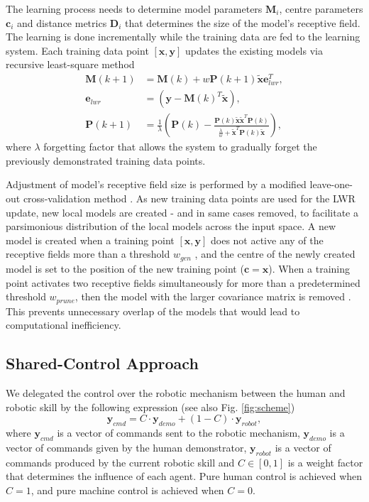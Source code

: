 The learning process needs to determine model parameters $\bm{M}_{i}$, centre parameters $\bm{c}_{i}$ and distance metrics $\bm{D}_{i}$ that determines the size of the model's receptive field. The learning is done incrementally while the training data are fed to the learning system. Each training data point $[\bm{x},\bm{y}]$ updates the existing models via  recursive least-square method \cite{Schaal1998}
\begin{align}
\bm{M}(k+1) &= \bm{M}(k) + w \bm{P}(k+1) \tilde{\bm{x}} \bm{e}_{lwr}^{T},\label{eq:lwr5} \\
\bm{e}_{lwr} &= (\bm{y}-\bm{M}(k)^{T}\tilde{\bm{x}}),\label{eq:lwr6} \\
\bm{P}(k+1) &= \frac{1}{\lambda}\left(\bm{P}(k)-\frac{\bm{P}(k)\tilde{\bm{x}}\tilde{\bm{x}}^{T}\bm{P}(k)}{\frac{\lambda}{w}+\tilde{\bm{x}}^{T}\bm{P}(k)\tilde{\bm{x}}}\right) ,\label{eq:lwr7}
\end{align}
where $\lambda$ forgetting factor that allows the system to gradually forget the previously demonstrated training data points.

Adjustment of model's receptive field size is performed by a modified leave-one-out cross-validation method \cite{Schaal1998}. As new training data points are used for the LWR update, new local models are created - and in same cases removed, to facilitate a parsimonious distribution of the local models across the input space. A new model is created when a training point $[\bm{x},\bm{y}]$ does not active any of the receptive fields more than a threshold $w_{gen}$ \cite{Schaal1998}, and the centre of the newly created model is set to the position of the new training point ($\bm{c}=\bm{x}$). When a training point activates two receptive fields simultaneously for more than a predetermined threshold $w_{prune}$, then the model with the larger covariance matrix is removed \cite{Schaal1998}. This prevents unnecessary overlap of the models that would lead to computational inefficiency.

\subsection{Shared-Control Approach}
We delegated the control over the robotic mechanism between the human and robotic skill by the following expression \cite{Peternel2013b} (see also Fig. \ref{fig:scheme})
\begin{equation}
\bm{y}_{cmd} = C \cdot \bm{y}_{demo} + (1-C) \cdot \bm{y}_{robot} ,
\label{eq:delegation}
\end{equation}
where $\bm{y}_{cmd}$ is a vector of commands sent to the robotic mechanism, $\bm{y}_{demo}$ is a vector of commands given by the human demonstrator, $\bm{y}_{robot}$ is a vector of commands produced by the current robotic skill and $C \in [0,1]$ is a weight factor that determines the influence of each agent. Pure human control is achieved when $C = 1$, and pure machine control is achieved when $C = 0$.

